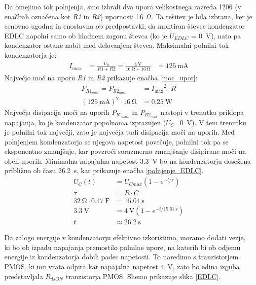 \documentclass[a4paper,twoside,openright,12pt,slovene]{book}
\begin{document}
Da omejimo tok polnjenja, smo izbrali dva upora velikostnega razreda 1206 (v enačbah označena kot \textit{R1} in \textit{R2}) upornosti \SI{16}{\ohm}. Ta rešitev je bila izbrana, ker je cenovno ugodna in enostavna ob predpostavki, da montiran števec kondenzator EDLC napolni samo ob hladnem zagonu števca (ko je $U_{EDLC}$ = \SI{0}{\volt}), nato pa kondenzator ostane nabit med delovanjem števca.
Maksimalni polnilni tok kondenzatorja je:
\begin{equation} 
\begin{aligned}
    I_{max}&=\frac{U_0}{R1+R2} = \frac{\SI{4}{\volt}}{\SI{16}{\ohm}+\SI{16}{\ohm} }&= \SI{125}{\milli\ampere}
\end{aligned}
\end{equation}
Največjo moč na uporu \textit{R1} in \textit{R2} prikazuje enačba \ref{moc_upor}:
\begin{equation}
\begin{aligned}
    P_{R1_{max}}=P_{R2_{max}} &={I_{\max}}^2\cdot R\\
    \left(\SI{125}{\milli\ampere}\right)^2 \cdot \SI{16}{\ohm} &= \SI{0.25}{\watt}
    \label{moc_upor}
\end{aligned}
\end{equation}
Največja disipacija moči na uporih $P_{R1_{max}}$ in $P_{R2_{max}}$ nastopi v trenutku priklopa napajanja, ko je kondenzator popolnoma izpraznjen ($U_C$=\SI{0}{\volt}). V tem trenutku je polnilni tok največji, zato je največja tudi disipacija moči na uporih. Med polnjenjem kondenzatorja se njegova napetost povečuje, polnilni tok pa se eksponentno zmanjšuje, kar povzroči sorazmerno zmanjšanje disipirane moči na obeh uporih.
Minimalna napajalna napetost \SI{3,3}{\volt} bo na kondenzatorju dosežena približno ob času \SI{26,2}{\second}, kar prikazuje enačba \ref{polnjenje_EDLC}.
\begin{equation}
\begin{aligned}
    U_C(t)&=U_{Cmax}\left(1-e^{-t/\tau}\right) \\
    \tau &= R\cdot C \\
    \SI{32}{\ohm} \cdot \SI{0,47}{\farad} &= \SI{15.04}{\second} \\
    \SI{3,3}{\volt} &=\SI{4}{\volt}\left(1-e^{-t/\SI{15.04}{\second}}\right) \\
    t &\approx \SI{26,2}{\second} 
    \label{polnjenje_EDLC}
\end{aligned} 
\end{equation}
\par Da zalogo energije v kondenzatorju efektivno izkoristimo, moramo dodati vezje, ki bo ob izpadu napajanja premostilo polnilne upore, na katerih bi ob odjemu energije iz kondenzatorja dobili padec napetosti. To naredimo s tranzistorjem PMOS, ki mu vrata odpira kar napajalna napetost \SI{4}{\volt}, zato bo edina izguba predstavljala $R_{dsON}$ tranzistorja PMOS. Shemo prikazuje slika \ref{EDLC}.
\end{document}
